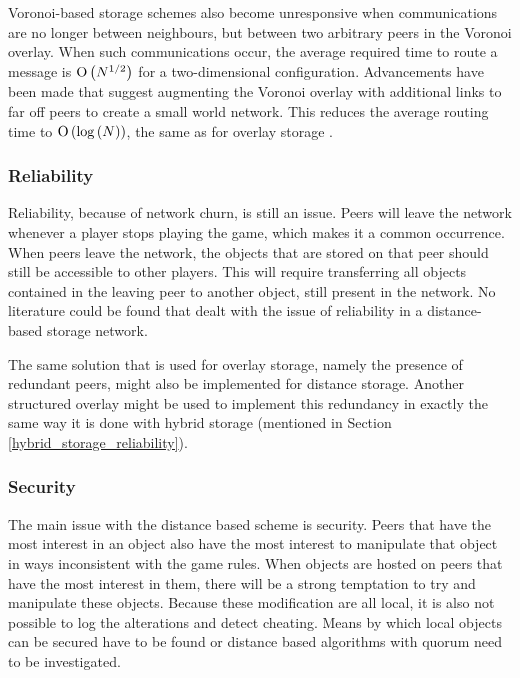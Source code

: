 Voronoi-based storage schemes also become unresponsive when communications are no longer between neighbours, but between two arbitrary peers in the
Voronoi overlay. When such communications occur, the average required time to route a message is $\operatorname{O}\left(N^{1/2}\right)$ for a two-dimensional configuration.
Advancements have been made that suggest augmenting the Voronoi overlay with additional links to far off peers to create a small world network. This
reduces the average routing time to $\operatorname{O}\left(\log{(N)}\right)$, the same as for overlay storage \cite{Steiner_voronoi_shortcuts}.

\subsubsection{Reliability}

Reliability, because of network churn, is still an issue. Peers will leave the network whenever a player stops playing the game, which makes it a common occurrence. When peers leave the network, the objects that are stored on that peer should still be accessible to other players. This will require transferring all objects contained in the leaving peer to another object, still present in the network. No literature could be found that dealt with the issue of reliability in a distance-based storage network.

The same solution that is used for overlay storage, namely the presence of redundant peers, might also be implemented for distance storage. Another structured overlay might be used to implement this redundancy in exactly the same way it is done with hybrid storage (mentioned in Section \ref{hybrid_storage_reliability}).

\subsubsection{Security}
\label{distance_based_storage_security}

The main issue with the distance based scheme is security. Peers that have the most interest in an object also have the most interest to manipulate that object in ways inconsistent with the game rules. When objects are hosted on peers that have the most interest in them, there will be a strong temptation to try and manipulate these objects. Because these modification are all local, it is also not possible to log the alterations and detect cheating. Means by which local objects can be secured have to be found or distance based algorithms with quorum need to be investigated.

